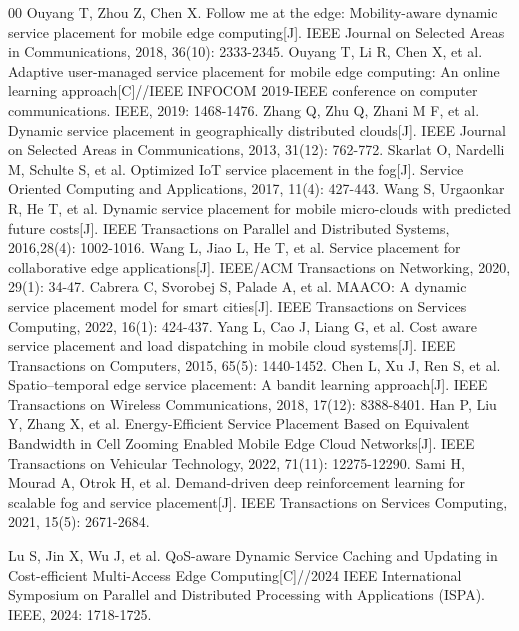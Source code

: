 \documentclass[10pt, conference, letterpaper]{IEEEtran}
\begin{document}
\begin{thebibliography}{00}
 Ouyang T, Zhou Z, Chen X. Follow me at the edge: Mobility-aware dynamic service placement for mobile edge computing[J]. IEEE Journal on Selected Areas in Communications, 2018, 36(10): 2333-2345.
 Ouyang T, Li R, Chen X, et al. Adaptive user-managed service placement for mobile edge computing: An online learning approach[C]//IEEE INFOCOM 2019-IEEE conference on computer communications. IEEE, 2019: 1468-1476.
 Zhang Q, Zhu Q, Zhani M F, et al. Dynamic service placement in geographically distributed clouds[J]. IEEE Journal on Selected Areas in Communications, 2013, 31(12): 762-772.
 Skarlat O, Nardelli M, Schulte S, et al. Optimized IoT service placement in the fog[J]. Service Oriented Computing and Applications, 2017, 11(4): 427-443.
 Wang S, Urgaonkar R, He T, et al. Dynamic service placement for mobile micro-clouds with predicted future costs[J]. IEEE Transactions on Parallel and Distributed Systems, 2016,28(4): 1002-1016.
 Wang L, Jiao L, He T, et al. Service placement for collaborative edge applications[J]. IEEE/ACM Transactions on Networking, 2020, 29(1): 34-47.
 Cabrera C, Svorobej S, Palade A, et al. MAACO: A dynamic service placement model for smart cities[J]. IEEE Transactions on Services Computing, 2022, 16(1): 424-437.
 Yang L, Cao J, Liang G, et al. Cost aware service placement and load dispatching in mobile cloud systems[J]. IEEE Transactions on Computers, 2015, 65(5): 1440-1452.
 Chen L, Xu J, Ren S, et al. Spatio–temporal edge service placement: A bandit learning approach[J]. IEEE Transactions on Wireless Communications, 2018, 17(12): 8388-8401.
 Han P, Liu Y, Zhang X, et al. Energy-Efficient Service Placement Based on Equivalent Bandwidth in Cell Zooming Enabled Mobile Edge Cloud Networks[J]. IEEE Transactions on Vehicular Technology, 2022, 71(11): 12275-12290.
 Sami H, Mourad A, Otrok H, et al. Demand-driven deep reinforcement learning for scalable fog and service placement[J]. IEEE Transactions on Services Computing, 2021, 15(5): 2671-2684.

 Lu S, Jin X, Wu J, et al. QoS-aware Dynamic Service Caching and Updating in Cost-efficient Multi-Access Edge Computing[C]//2024 IEEE International Symposium on Parallel and Distributed Processing with Applications (ISPA). IEEE, 2024: 1718-1725.


\end{thebibliography}
\end{document}
